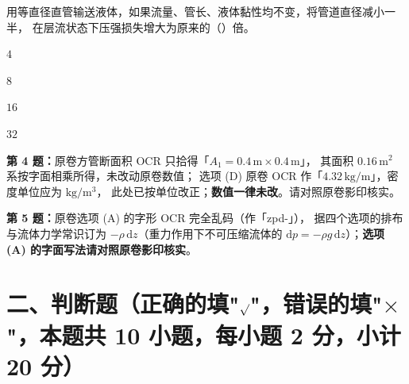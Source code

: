 \begin{ti}
  \item 用等直径直管输送液体，如果流量、管长、液体黏性均不变，将管道直径减小一半，
  在层流状态下压强损失增大为原来的（\quad）倍。\hfill{}
  \begin{choices}
    \item $4$
    \item $8$
    \item $16$
    \item $32$
  \end{choices}
\end{ti}

\begin{tishi}
\textbf{第 4 题：}原卷方管断面积 OCR 只拾得「$A_1=0.4\,\mathrm{m}\times0.4\,\mathrm{m}$」，
其面积 $0.16\,\mathrm{m^2}$ 系按字面相乘所得，未改动原卷数值；
选项 (D) 原卷 OCR 作「$4.32\,\mathrm{kg/m}$」，密度单位应为 $\mathrm{kg/m^3}$，
此处已按单位改正；\textbf{数值一律未改}。请对照原卷影印核实。

\textbf{第 5 题：}原卷选项 (A) 的字形 OCR 完全乱码（作「zpd-」），
据四个选项的排布与流体力学常识订为 $-\rho\,\mathrm{d}z$（重力作用下不可压缩流体的
$\mathrm{d}p=-\rho g\,\mathrm{d}z$）；\textbf{选项 (A) 的字面写法请对照原卷影印核实}。
\end{tishi}

\section{二、判断题（正确的填"$\surd$"，错误的填"$\times$"，本题共 10 小题，每小题 2 分，小计 20 分）}

